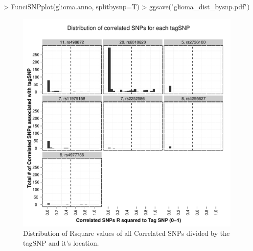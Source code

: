 \documentclass[a4paper]{article}
\begin{document}
\begin{Schunk}
\begin{Sinput}
> FunciSNPplot(glioma.anno, splitbysnp=T)
> ggsave("glioma_dist_bysnp.pdf")
\end{Sinput}
\end{Schunk}
\begin{figure}[ht!]
\begin{center}
\includegraphics{glioma_dist_bysnp.pdf}
\caption{\label{fig:glioma_dist_bysnp.pdf} Distribution of Rsquare values of all
 Correlated SNPs divided by the tagSNP and it's location.}
{\footnotesize{}}
\end{center}
\end{figure}
\end{document}
